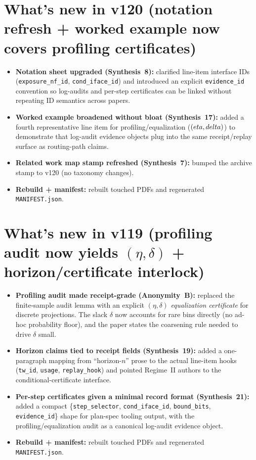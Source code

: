 \documentclass[11pt]{article}
\begin{document}
\section{What's new in v120 (notation refresh + worked example now covers profiling certificates)}
\begin{itemize}[leftmargin=*]
\item \textbf{Notation sheet upgraded (Synthesis~8):} clarified line-item interface IDs (\texttt{exposure\_nf\_id}, \texttt{cond\_iface\_id}) and introduced an explicit \texttt{evidence\_id} convention so log-audits and per-step certificates can be linked without repeating ID semantics across papers.
\item \textbf{Worked example broadened without bloat (Synthesis~17):} added a fourth representative line item for profiling/equalization ($(\\eta,\\delta)$) to demonstrate that log-audit evidence objects plug into the same receipt/replay surface as routing-path claims.
\item \textbf{Related work map stamp refreshed (Synthesis~7):} bumped the archive stamp to v120 (no taxonomy changes).
\item \textbf{Rebuild + manifest:} rebuilt touched PDFs and regenerated \texttt{MANIFEST.json}.
\end{itemize}

\section{What's new in v119 (profiling audit now yields $(\eta,\delta)$ + horizon/certificate interlock)}
\begin{itemize}[leftmargin=*]
\item \textbf{Profiling audit made receipt-grade (Anonymity~B):} replaced the finite-sample audit lemma with an explicit \emph{$(\eta,\delta)$ equalization certificate} for discrete projections. The slack $\delta$ now accounts for rare bins directly (no ad-hoc probability floor), and the paper states the coarsening rule needed to drive $\delta$ small.
\item \textbf{Horizon claims tied to receipt fields (Synthesis~19):} added a one-paragraph mapping from ``horizon-$n$'' prose to the actual line-item hooks (\texttt{tw\_id}, \texttt{usage}, \texttt{replay\_hook}) and pointed Regime~II authors to the conditional-certificate interface.
\item \textbf{Per-step certificates given a minimal record format (Synthesis~21):} added a compact \{\texttt{step\_selector}, \texttt{cond\_iface\_id}, \texttt{bound\_bits}, \texttt{evidence\_id}\} shape for plan-spec tooling output, with the profiling/equalization audit as a canonical log-audit evidence object.
\item \textbf{Rebuild + manifest:} rebuilt touched PDFs and regenerated \texttt{MANIFEST.json}.
\end{itemize}
\end{document}
